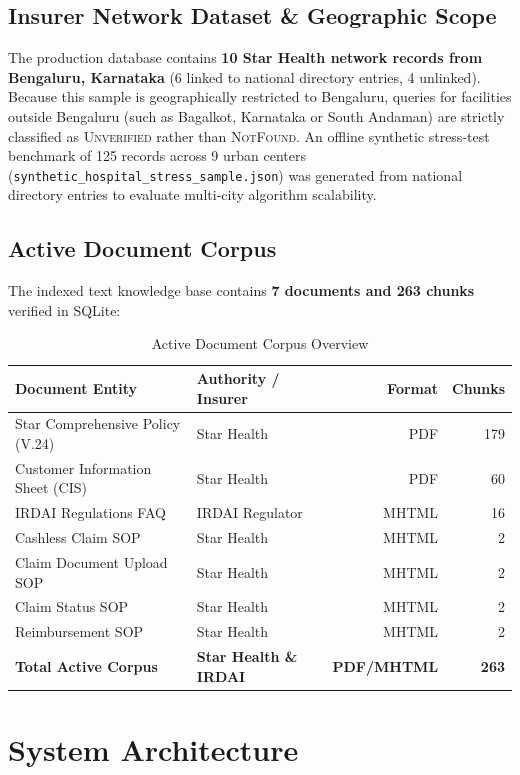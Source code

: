\documentclass[conference]{IEEEtran}
\begin{document}
\subsection{Insurer Network Dataset \& Geographic Scope}
The production database contains \textbf{10 Star Health network records from Bengaluru, Karnataka} (6 linked to national directory entries, 4 unlinked). Because this sample is geographically restricted to Bengaluru, queries for facilities outside Bengaluru (such as Bagalkot, Karnataka or South Andaman) are strictly classified as \textsc{Unverified} rather than \textsc{NotFound}. An offline synthetic stress-test benchmark of 125 records across 9 urban centers (\texttt{synthetic\_hospital\_stress\_sample.json}) was generated from national directory entries to evaluate multi-city algorithm scalability.

\subsection{Active Document Corpus}
The indexed text knowledge base contains \textbf{7 documents and 263 chunks} verified in SQLite:

\begin{table}[htbp]
\caption{Active Document Corpus Overview}
\begin{center}
\begin{tabular}{llrr}
\toprule
\textbf{Document Entity} & \textbf{Authority / Insurer} & \textbf{Format} & \textbf{Chunks} \\
\midrule
Star Comprehensive Policy (V.24) & Star Health & PDF & 179 \\
Customer Information Sheet (CIS) & Star Health & PDF & 60 \\
IRDAI Regulations FAQ & IRDAI Regulator & MHTML & 16 \\
Cashless Claim SOP & Star Health & MHTML & 2 \\
Claim Document Upload SOP & Star Health & MHTML & 2 \\
Claim Status SOP & Star Health & MHTML & 2 \\
Reimbursement SOP & Star Health & MHTML & 2 \\
\midrule
\textbf{Total Active Corpus} & \textbf{Star Health \& IRDAI} & \textbf{PDF/MHTML} & \textbf{263} \\
\bottomrule
\end{tabular}
\end{center}
\end{table}

\section{System Architecture}
\end{document}

